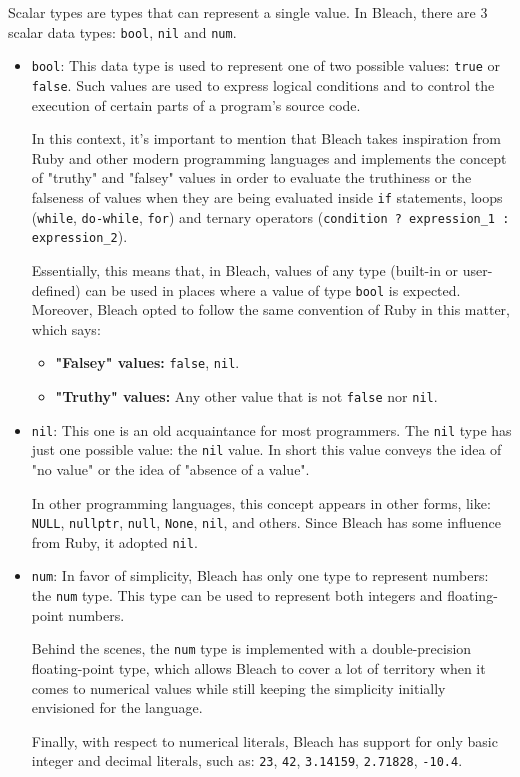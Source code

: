 Scalar types are types that can represent a single value. In Bleach, there are 3 scalar data types: \texttt{bool}, \texttt{nil} and \texttt{num}.
\begin{itemize}
    \item \texttt{bool}: This data type is used to represent one of two possible values: \texttt{true} or \texttt{false}. Such values are used to express logical conditions and to control the execution of certain parts of a program's source code.
    
    In this context, it's important to mention that Bleach takes inspiration from Ruby and other modern programming languages and implements the concept of "truthy" and "falsey" values in order to evaluate the truthiness or the falseness of values when they are being evaluated inside \texttt{if} statements, loops (\texttt{while}, \texttt{do-while}, \texttt{for}) and ternary operators (\texttt{condition ? expression\_1 : expression\_2}).

    Essentially, this means that, in Bleach, values of any type (built-in or user-defined) can be used in places where a value of type \texttt{bool} is expected. Moreover, Bleach opted to follow the same convention of Ruby in this matter, which says:

    \begin{itemize}
        \item \textbf{"Falsey" values:} \texttt{false}, \texttt{nil}.
        \item \textbf{"Truthy" values:} Any other value that is not \texttt{false} nor \texttt{nil}.
    \end{itemize}
    
    \item \texttt{nil}: This one is an old acquaintance for most programmers. The \texttt{nil} type has just one possible value: the \texttt{nil} value. In short this value conveys the idea of "no value" or the idea of "absence of a value".

    In other programming languages, this concept appears in other forms, like: \texttt{NULL}, \texttt{nullptr}, \texttt{null}, \texttt{None}, \texttt{nil}, and others. Since Bleach has some influence from Ruby, it adopted \texttt{nil}.
    
    \item \texttt{num}: In favor of simplicity, Bleach has only one type to represent numbers: the \texttt{num} type. This type can be used to represent both integers and floating-point numbers.

    Behind the scenes, the \texttt{num} type is implemented with a double-precision floating-point type, which allows Bleach to cover a lot of territory when it comes to numerical values while still keeping the simplicity initially envisioned for the language.
    
    Finally, with respect to numerical literals, Bleach has support for only basic integer and decimal literals, such as: \texttt{23}, \texttt{42}, \texttt{3.14159}, \texttt{2.71828}, \texttt{-10.4}.
    
\end{itemize}

